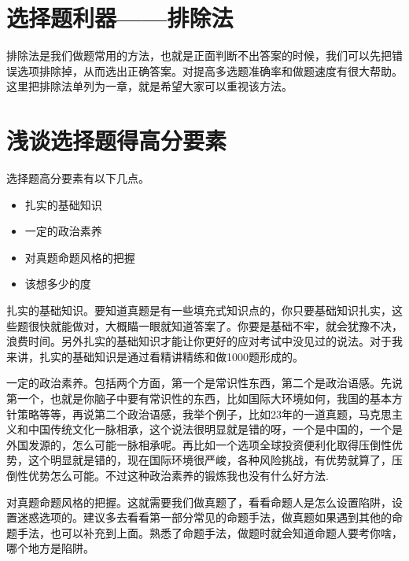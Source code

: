 \documentclass[lang=cn,newtx,10pt,scheme=chinese,pad,twocol]{zznote}
\begin{document}
\chapter{选择题利器——排除法}
\begin{definition}
	排除法是我们做题常用的方法，也就是正面判断不出答案的时候，我们可以先把错误选项排除掉，从而选出正确答案。对提高多选题准确率和做题速度有很大帮助。这里把排除法单列为一章，就是希望大家可以重视该方法。
\end{definition}
\chapter{浅谈选择题得高分要素}
选择题高分要素有以下几点。
\begin{itemize}
	\item 扎实的基础知识
	\item 一定的政治素养
	\item 对真题命题风格的把握
	\item 该想多少的度
\end{itemize}


\begin{definition}[扎实的基础知识]
	扎实的基础知识。要知道真题是有一些填充式知识点的，你只要基础知识扎实，这些题很快就能做对，大概瞄一眼就知道答案了。你要是基础不牢，就会犹豫不决，浪费时间。另外扎实的基础知识才能让你更好的应对考试中没见过的说法。对于我来讲，扎实的基础知识是通过看精讲精练和做1000题形成的。
\end{definition}


\begin{definition}[一定的政治素养]
	一定的政治素养。包括两个方面，第一个是常识性东西，第二个是政治语感。先说第一个，也就是你脑子中要有常识性的东西，比如国际大环境如何，我国的基本方针策略等等，再说第二个政治语感，我举个例子，比如23年的一道真题，马克思主义和中国传统文化一脉相承，这个说法很明显就是错的呀，一个是中国的，一个是外国发源的，怎么可能一脉相承呢。再比如一个选项全球投资便利化取得压倒性优势，这个明显就是错的，现在国际环境很严峻，各种风险挑战，有优势就算了，压倒性优势怎么可能。不过这种政治素养的锻炼我也没有什么好方法.
\end{definition}

\begin{definition}[对真题命题风格的把握]
	对真题命题风格的把握。这就需要我们做真题了，看看命题人是怎么设置陷阱，设置迷惑选项的。建议多去看看第一部分常见的命题手法，做真题如果遇到其他的命题手法，也可以补充到上面。熟悉了命题手法，做题时就会知道命题人要考你啥，哪个地方是陷阱。
\end{definition}
\end{document}
